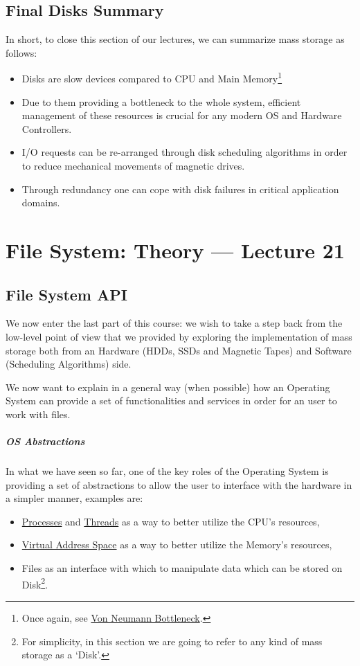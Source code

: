 \documentclass[openright, twoside]{report}
\theoremstyle{definition}
\theoremstyle{example}
\begin{document}
\section{Final Disks Summary}
In short, to close this section of our lectures, we can summarize mass storage as follows:

\begin{itemize}
	\item Disks are slow devices compared to CPU and 
	Main Memory\footnote{
		Once again, see \href{https://en.wikipedia.org/wiki/Von_Neumann_architecture\#Von_Neumann_bottleneck}{Von Neumann Bottleneck}.
		}
	\item Due to them providing a bottleneck to the whole system, efficient management of these 
	resources is crucial for any modern OS and Hardware Controllers.
	\item I/O requests can be re-arranged through disk scheduling algorithms in order to 
	reduce mechanical movements of magnetic drives.
	\item Through redundancy one can cope with disk failures in critical application domains.
\end{itemize}

\chapter{File System: Theory --- Lecture 21}
\section{File System API}
We now enter the last part of this course: we wish to take a step back from the low-level 
point of view that we provided by exploring the implementation of mass storage both from an 
Hardware (HDDs, SSDs and Magnetic Tapes) and Software (Scheduling Algorithms) side.

We now want to explain in a general way (when possible) how an Operating System can provide a set of 
functionalities and services in order for an user to work with files.

\paragraph{OS Abstractions}
In what we have seen so far, one of the key roles of the Operating System is providing a set 
of abstractions to allow the user to interface with the hardware in a simpler manner, examples are: 

\begin{itemize}
	\item \hyperref[ssec:proc]{Processes} and \hyperref[sec:threads]{Threads} as a way to better utilize the CPU's resources,
	\item \hyperref[sec:vmem]{Virtual Address Space} as a way to better utilize the Memory's resources,
	\item Files as an interface with which to manipulate data which can be stored on Disk\footnote{For simplicity, in this section we 
	are going to refer to any kind of mass storage as a `Disk'.}.
\end{itemize}
\end{document}
